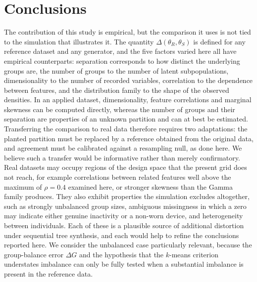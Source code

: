 \documentclass[pdflatex,referee]{sn-jnl}
\begin{document}
\section{Conclusions}

The contribution of this study is empirical, but the comparison it uses is not
tied to the simulation that illustrates it.
The quantity $\Delta(\theta_R, \theta_S)$ is defined for any reference dataset
and any generator, and the five factors varied here all have empirical
counterparts: separation corresponds to how distinct the underlying groups
are, the number of groups to the number of latent subpopulations,
dimensionality to the number of recorded variables, correlation to the
dependence between features, and the distribution family to the shape of the
observed densities.
In an applied dataset, dimensionality, feature correlations and marginal
skewness can be computed directly, whereas the number of groups and their
separation are properties of an unknown partition and can at best be
estimated.
Transferring the comparison to real data therefore requires two adaptations:
the planted partition must be replaced by a reference obtained from the
original data, and agreement must be calibrated against a resampling null, as
done here.
We believe such a transfer would be informative rather than merely
confirmatory.
Real datasets may occupy regions of the design space that the present grid
does not reach, for example correlations between related features well above
the maximum of $\rho = 0.4$ examined here, or stronger skewness than the Gamma
family produces.
They also exhibit properties the simulation excludes altogether, such
as strongly unbalanced group sizes, ambiguous missingness in which a zero may
indicate either genuine inactivity or a non-worn device, and heterogeneity
between individuals. Each of these is a plausible source of additional
distortion under sequential tree synthesis, and each would help to refine the
conclusions reported here. We consider the unbalanced case particularly
relevant, because the group-balance error $\Delta G$ and the hypothesis that
the $k$-means criterion understates imbalance can only be fully tested when a
substantial imbalance is present in the reference data.
\end{document}
